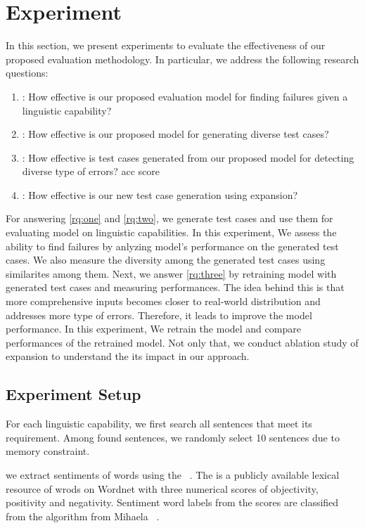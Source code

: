 \section{Experiment}
\label{sec:experiment}
%
In this section, we present experiments to
evaluate the effectiveness of our proposed evaluation methodology. In
particular, we address the following research questions:

\begin{enumerate}[label=\textbf{RQ\arabic*}]
\item \label{rq:one}: How effective is our proposed evaluation model
  for finding failures given a linguistic capability?
\item \label{rq:two}: How effective is our proposed model for
  generating diverse test cases? %
\item \label{rq:three}: How effective is test cases generated from our
  proposed model for detecting diverse type of errors? %
  acc score
\item \label{rq:four}: How effective is our new test case generation
  using \cfg expansion? %
\end{enumerate}

For answering \ref{rq:one} and \ref{rq:two}, we generate test cases
and use them for evaluating model on linguistic capabilities. In this
experiment, We assess the ability to find failures by anlyzing model's
performance on the generated test cases. We also measure the diversity
among the generated test cases using similarites among them. Next, we
answer \ref{rq:three} by retraining \sa model with generated test
cases and measuring performances. The idea behind this is that more
comprehensive inputs becomes closer to real-world distribution and
addresses more type of errors.  Therefore, it leads to improve the
model performance. In this experiment, We retrain the model and
compare performances of the retrained model. Not only that, we conduct
ablation study of \cfg expansion to understand the its impact in our
approach.

\subsection{Experiment Setup}
%
%
For each linguistic capability, we first search all sentences that
meet its requirement. Among found sentences, we randomly select 10
sentences due to memory constraint.

%
we extract sentiments of words using the
\Swn~\cite{baccianella2010sentiwordnet}. The \Swn is a publicly
available lexical resource of wrods on Wordnet with three numerical
scores of objectivity, positivity and negativity. Sentiment word
labels from the scores are classified from the algorithm from Mihaela
\etal~\cite{mihaela2017sentiwordnetlabel}.

